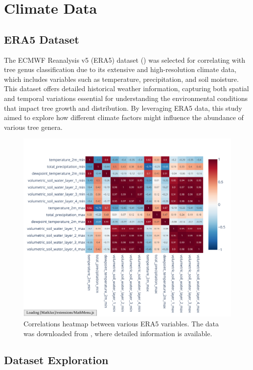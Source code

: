 \chapter{Climate Data}
\label{chapter:climate}
\section{ERA5 Dataset}

The ECMWF Reanalysis v5 (ERA5) dataset (\cite{era5}) was selected for correlating with tree genus classification due to its extensive and high-resolution climate data, which includes variables such as temperature, precipitation, and soil moisture. This dataset offers detailed historical weather information, capturing both spatial and temporal variations essential for understanding the environmental conditions that impact tree growth and distribution. By leveraging ERA5 data, this study aimed to explore how different climate factors might influence the abundance of various tree genera.

\begin{figure}[ht]
    \centering
    \includegraphics[width=0.96\linewidth, trim={20pt 20pt 10pt 40pt}, clip]{figures/figures_climate/weather_correlations.pdf}
    \caption{Correlations heatmap between various ERA5 variables. The data was downloaded from \cite{era5_dataset}, where detailed information is available.}
    \label{fig:weather_correlations}
\end{figure}

\section{Dataset Exploration}

